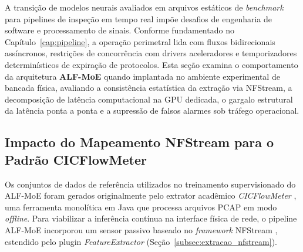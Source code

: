 A transição de modelos neurais avaliados em arquivos estáticos de \emph{benchmark} para pipelines de
inspeção em tempo real impõe desafios de engenharia de software e processamento de sinais. Conforme
fundamentado no Capítulo~\ref{cap:pipeline}, a operação perimetral lida com fluxos bidirecionais
assíncronos, restrições de concorrência com drivers aceleradores e temporizadores determinísticos de
expiração de protocolos. Esta seção examina o comportamento da arquitetura \textbf{ALF-MoE} quando
implantada no ambiente experimental de bancada física, avaliando a consistência estatística da extração
via NFStream, a decomposição de latência computacional na GPU dedicada, o gargalo estrutural da latência
ponta a ponta e a supressão de falsos alarmes sob tráfego operacional.

\subsection{Impacto do Mapeamento NFStream para o Padrão CICFlowMeter}
\label{subsec:impacto_mapeamento}

Os conjuntos de dados de referência utilizados no treinamento supervisionado do ALF-MoE foram gerados
originalmente pelo extrator acadêmico \emph{CICFlowMeter} \cite{Sharafaldin2018TowardGA}, uma
ferramenta monolítica em Java que processa arquivos PCAP em modo \emph{offline}. Para viabilizar a
inferência contínua na interface física de rede, o pipeline ALF-MoE incorporou um sensor passivo baseado
no \emph{framework} NFStream \cite{AOUINI2022108719}, estendido pelo plugin \emph{FeatureExtractor}
(Seção~\ref{subsec:extracao_nfstream}).

